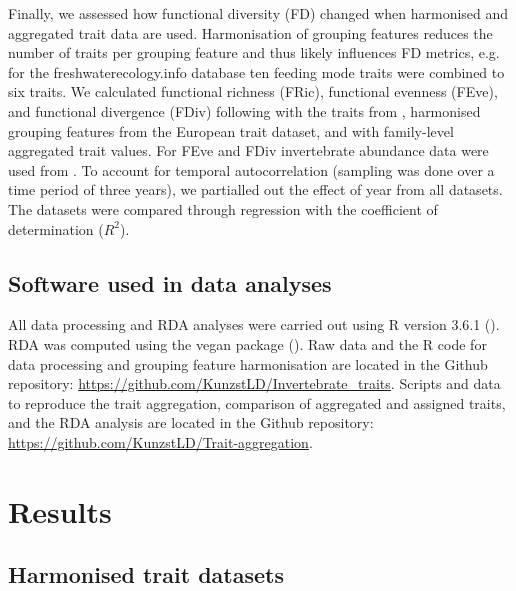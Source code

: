 \documentclass[12pt]{article}
\begin{document}
Finally, we assessed how functional diversity (FD) changed when harmonised and aggregated trait data are used. Harmonisation of grouping features reduces the number of traits per grouping feature and thus likely influences FD metrics, e.g. for the freshwaterecology.info database ten feeding mode traits were combined to six traits. We calculated functional richness (FRic), functional evenness (FEve), and functional divergence (FDiv) following \citet{villegerNewMultidimensionalFunctional2008a} with the traits from \citet{szocs_effects_2014}, harmonised grouping features from the European trait dataset, and with family-level aggregated trait values. For FEve and FDiv invertebrate abundance data were used from \citet{szocs_effects_2014}. To account for temporal autocorrelation (sampling was done over a time period of three years), we partialled out the effect of year from all datasets. The datasets were compared through regression with the coefficient of determination ($R^2$).



\subsection*{Software used in data analyses}

All data processing and RDA analyses were carried out using R version 3.6.1 (\cite{cite_R}). RDA was computed using the vegan package (\cite{cite_vegan}). Raw data and the R code for data processing and grouping feature harmonisation are located in the Github repository: \url{https://github.com/KunzstLD/Invertebrate_traits}. Scripts and data to reproduce the trait aggregation, comparison of aggregated and assigned traits, and the RDA analysis are located in the Github repository: \url{https://github.com/KunzstLD/Trait-aggregation}.

\newpage


\section*{Results}

\subsection*{Harmonised trait datasets}
\end{document}
